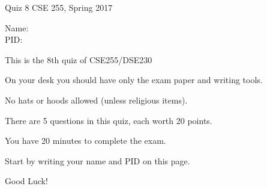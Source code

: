 \documentclass[10pt]{article}
\begin{document}
\setlength\parindent{0pt}
\thispagestyle{empty}

{\textbf \Large Quiz 8} \hfill CSE 255, Spring 2017
\\

\vspace{.1in}

Name: \underline{\hspace{3in}}
\\

PID: \underline{\hspace{3.15in}}

\vspace{.1in}

{\small \setlength\parindent{20pt}This is the 8th quiz of CSE255/DSE230

  On your desk you should have only the exam paper and writing tools.
  
No hats or hoods allowed (unless religious items).

There are 5 questions in this quiz, each worth 20 points.

You have 20 minutes to complete the exam.

Start by writing your name and PID on this page.

Good Luck!}\\
\underline{\hspace{6in}}
\end{document}
